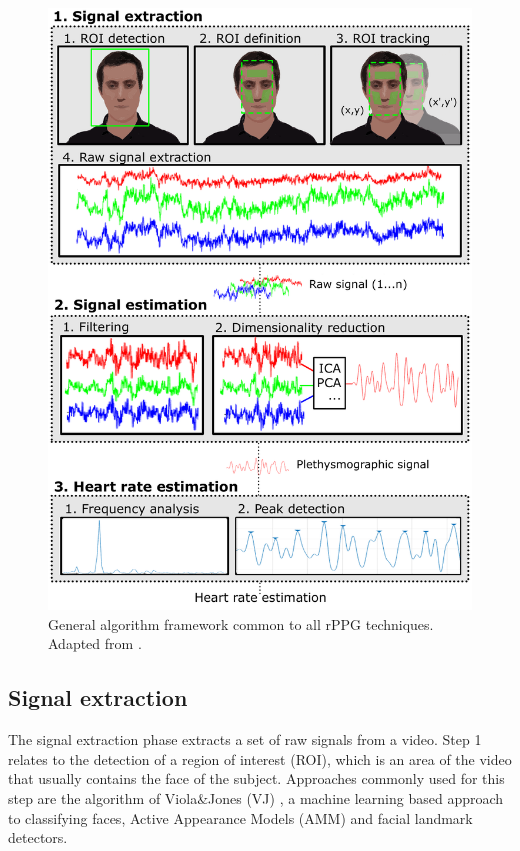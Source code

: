 \begin{figure}
\centering
\includegraphics[width=0.9\linewidth]{Content/figures/general-rppg}
\caption{General algorithm framework common to all rPPG techniques. Adapted from \textcite{rouast2016remote}.}
\label{fig:rppg}
\end{figure}

\subsection{Signal extraction}

The signal extraction phase extracts a set of raw signals from a video. Step 1 relates to the detection of a region of interest (ROI), which is an area of the video that usually contains the face of the subject. Approaches commonly used for this step are the algorithm of Viola\&Jones (VJ) \parencite{viola2004robust}, a machine learning based approach to classifying faces, Active Appearance Models (AMM) \parencite{EdwardsAAM} and facial landmark detectors. %

